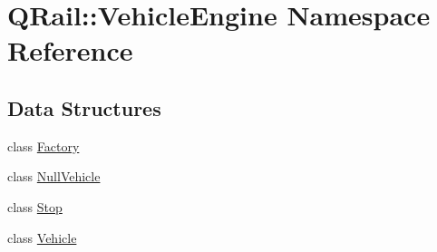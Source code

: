 \hypertarget{namespaceQRail_1_1VehicleEngine}{}\section{Q\+Rail\+::Vehicle\+Engine Namespace Reference}
\label{namespaceQRail_1_1VehicleEngine}
\subsection*{Data Structures}
\begin{DoxyCompactItemize}
\item 
class \mbox{\hyperlink{classQRail_1_1VehicleEngine_1_1Factory}{Factory}}
\item 
class \mbox{\hyperlink{classQRail_1_1VehicleEngine_1_1NullVehicle}{Null\+Vehicle}}
\item 
class \mbox{\hyperlink{classQRail_1_1VehicleEngine_1_1Stop}{Stop}}
\item 
class \mbox{\hyperlink{classQRail_1_1VehicleEngine_1_1Vehicle}{Vehicle}}
\end{DoxyCompactItemize}
